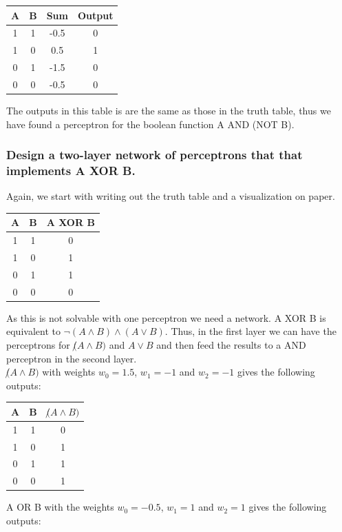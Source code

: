 \documentclass{article}
\begin{document}
\begin{table}[h!]
\centering
\begin{tabular}{c c c c}
 A & B & Sum & Output\\
\hline
1&1&-0.5&0\\
1&0&0.5&1\\
0&1&-1.5&0\\
0&0&-0.5&0
\end{tabular}
\end{table}

The outputs in this table is are the same as those in the truth table, thus we have found a perceptron for the boolean function A AND (NOT B). 

\subsubsection{Design a two-layer network of perceptrons that that implements A XOR B.}
Again, we start with writing out the truth table and a visualization on paper.

\begin{table}[h!]
\centering
\begin{tabular}{c c c }
 A & B & A XOR B\\
\hline
1&1&0\\
1&0&1\\
0&1&1\\
0&0&0
\end{tabular}
\end{table}

As this is not solvable with one perceptron we need a network. A XOR B is equivalent to $\lnot(A \land B) \land (A \lor B)$. Thus, in the first layer we can have the perceptrons for $ \not(A\land B)$ and $A\lor B$ and then feed the results to a AND perceptron in the second layer.\\

 $ \not(A\land B)$ with weights $w_0 = 1.5$, $w_1 = -1$ and $w_2 = -1$ gives the following outputs:

\begin{table}[h!]
\centering
\begin{tabular}{c c c }
 A & B & $ \not(A\land B)$\\
\hline
1&1&0\\
1&0&1\\
0&1&1\\
0&0&1
\end{tabular}
\end{table}

A OR B with the weights  $w_0 = -0.5$, $w_1 = 1$ and $w_2 = 1$ gives the following outputs:
\end{document}
